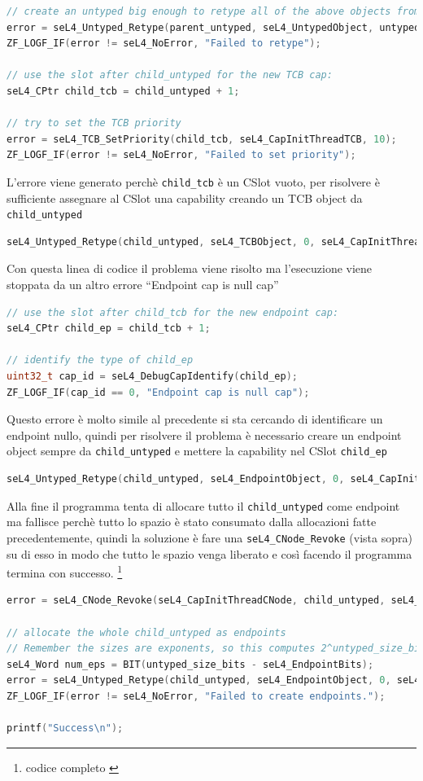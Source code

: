 \begin{lstlisting}[language=C++]
// create an untyped big enough to retype all of the above objects from
error = seL4_Untyped_Retype(parent_untyped, seL4_UntypedObject, untyped_size_bits, seL4_CapInitThreadCNode, 0, 0, child_untyped, 1);
ZF_LOGF_IF(error != seL4_NoError, "Failed to retype");

// use the slot after child_untyped for the new TCB cap:
seL4_CPtr child_tcb = child_untyped + 1;

// try to set the TCB priority
error = seL4_TCB_SetPriority(child_tcb, seL4_CapInitThreadTCB, 10);
ZF_LOGF_IF(error != seL4_NoError, "Failed to set priority");
\end{lstlisting}
L'errore viene generato perchè \texttt{child\_tcb} è un CSlot vuoto, per risolvere è sufficiente assegnare al CSlot una capability creando un TCB object da \texttt{child\_untyped}
\begin{lstlisting}[language=C++]
seL4_Untyped_Retype(child_untyped, seL4_TCBObject, 0, seL4_CapInitThreadCNode, 0, 0, child_tcb, 1);
\end{lstlisting}
Con questa linea di codice il problema viene risolto ma l'esecuzione viene stoppata da un altro errore “Endpoint cap is null cap”
\begin{lstlisting}[language=C++]
// use the slot after child_tcb for the new endpoint cap:
seL4_CPtr child_ep = child_tcb + 1;

// identify the type of child_ep
uint32_t cap_id = seL4_DebugCapIdentify(child_ep);
ZF_LOGF_IF(cap_id == 0, "Endpoint cap is null cap");
\end{lstlisting}
Questo errore è molto simile al precedente si sta cercando di identificare un endpoint nullo, quindi per risolvere il problema è necessario creare un endpoint object sempre da \texttt{child\_untyped} e mettere la capability nel CSlot \texttt{child\_ep}
\begin{lstlisting}[language=C++]
seL4_Untyped_Retype(child_untyped, seL4_EndpointObject, 0, seL4_CapInitThreadCNode, 0, 0, child_ep, 1);
\end{lstlisting}
Alla fine il programma tenta di allocare tutto il \texttt{child\_untyped} come endpoint ma fallisce perchè tutto lo spazio è stato consumato dalla allocazioni fatte precedentemente, quindi la soluzione è fare una \texttt{seL4\_CNode\_Revoke} (vista sopra) su di esso in modo che tutto le spazio venga liberato e così facendo il programma termina con successo. \footnote{codice completo \cite{untyped}}
\begin{lstlisting}[language=C++]
error = seL4_CNode_Revoke(seL4_CapInitThreadCNode, child_untyped, seL4_WordBits);

// allocate the whole child_untyped as endpoints
// Remember the sizes are exponents, so this computes 2^untyped_size_bits / 2^seL4_EndpointBits:
seL4_Word num_eps = BIT(untyped_size_bits - seL4_EndpointBits);
error = seL4_Untyped_Retype(child_untyped, seL4_EndpointObject, 0, seL4_CapInitThreadCNode, 0, 0, child_tcb, num_eps);
ZF_LOGF_IF(error != seL4_NoError, "Failed to create endpoints.");

printf("Success\n");
\end{lstlisting}

